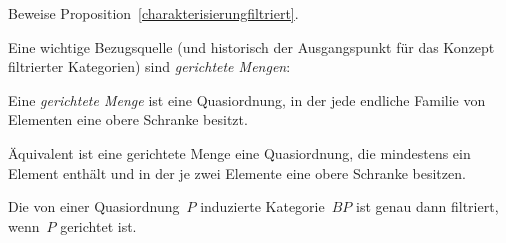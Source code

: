 \begin{aufg}Beweise Proposition~\ref{charakterisierungfiltriert}.\end{aufg}

Eine wichtige Bezugsquelle (und historisch der Ausgangspunkt für das Konzept
filtrierter Kategorien) sind \emph{gerichtete Mengen}:
\begin{defn}Eine \emph{gerichtete Menge} ist eine Quasiordnung, in der jede
endliche Familie von Elementen eine obere Schranke besitzt.\end{defn}
Äquivalent ist eine gerichtete Menge eine Quasiordnung, die mindestens ein
Element enthält und in der je zwei Elemente eine obere Schranke besitzen.
\begin{prop}Die von einer Quasiordnung~$P$ induzierte Kategorie~$BP$ ist genau
dann filtriert, wenn~$P$ gerichtet ist.\end{prop}

